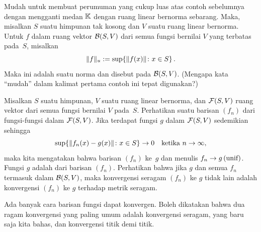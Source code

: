 \begin{exam}\label{C023133} Mudah untuk membuat perumuman yang cukup luas atas contoh
sebelumnya dengan mengganti medan $\mathbb{K}$ dengan ruang linear bernorma sebarang. Maka,
misalkan $S$ suatu himpunan tak kosong dan $V$ suatu ruang linear bernorma. Untuk $f$
dalam ruang vektor $\mathcal{B}(S,V)$ dari semua fungsi bernilai $V$ yang terbatas pada~$S$,
misalkan
  \[ \lVert f\rVert_u := \sup\{\lVert f(x)\rVert \colon x \in S\}\,. \]
Maka ini adalah suatu norma dan disebut
 pada $\mathcal{B}(S,V)$. (Mengapa kata ``mudah'' dalam kalimat pertama
contoh ini tepat digunakan?)
\end{exam}

\begin{defn} Misalkan $S$ suatu himpunan, $V$ suatu ruang linear bernorma, dan
$\mathcal{F}(S,V)$ ruang vektor dari semua fungsi bernilai $V$ pada~$S$. Perhatikan suatu
barisan $(f_n)$ dari fungsi-fungsi dalam $\mathcal{F}(S,V)$. Jika terdapat fungsi $g$ dalam
$\mathcal{F}(S,V)$ sedemikian sehingga
   \[ \sup\{\lVert f_n(x) - g(x)\rVert\colon x \in S\} \rightarrow 0
      \quad \text{ketika $n \rightarrow \infty$,} \]
maka kita mengatakan bahwa barisan $(f_n)$
 ke~$g$ dan menulis $f_n \rightarrow g \text{\,(unif)}$. Fungsi $g$
adalah
 dari barisan $(f_n)$. Perhatikan bahwa jika $g$ dan semua $f_n$
termasuk dalam $\mathcal{B}(S,V)$, maka konvergensi seragam $(f_n)$ ke $g$ tidak lain adalah
konvergensi $(f_n)$ ke $g$ terhadap metrik seragam.
\end{defn}

Ada banyak cara barisan fungsi dapat konvergen. Boleh dikatakan bahwa dua ragam
konvergensi yang paling umum adalah konvergensi seragam, yang baru saja kita bahas, dan
konvergensi titik demi titik.

